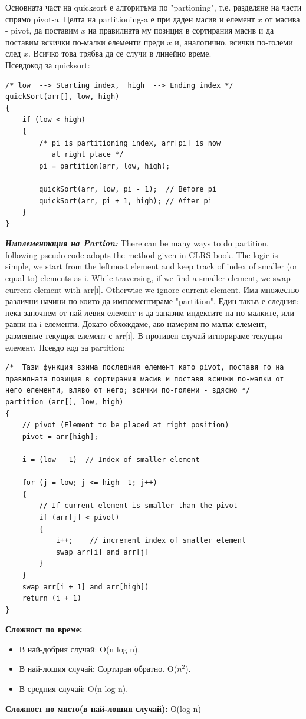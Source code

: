 \documentclass[11pt]{article} %
\newcommand{\italicBold}[1]{\textbf{\emph{#1}}}
\begin{document}
Основната част на quicksort е алгоритъма по "partioning", т.е. разделяне на части спрямо pivot-a. Целта на partitioning-a е при даден масив и елемент $x$ от масива - pivot, да поставим $x$ на правилната му позиция в сортирания масив и да поставим вскички по-малки елементи преди $x$ и, аналогично, всички по-големи след $x$. Всичко това трябва да се случи в линейно време.\\
Псевдокод за quicksort:
\begin{verbatim}
/* low  --> Starting index,  high  --> Ending index */
quickSort(arr[], low, high)
{
    if (low < high)
    {
        /* pi is partitioning index, arr[pi] is now
           at right place */
        pi = partition(arr, low, high);

        quickSort(arr, low, pi - 1);  // Before pi
        quickSort(arr, pi + 1, high); // After pi
    }
}
\end{verbatim}


\italicBold{Имплементация на Partion: }There can be many ways to do partition, following pseudo code adopts the method given in CLRS book. The logic is simple, we start from the leftmost element and keep track of index of smaller (or equal to) elements as i. While traversing, if we find a smaller element, we swap current element with arr[i]. Otherwise we ignore current element. Има множество различни начини по които да имплементираме "partition". Един такъв е следния: нека започнем от най-левия елемент и да запазим индексите на по-малките, или равни на i елементи. Докато обхождаме, ако намерим по-малък елемент, разменяме текущия елемент с arr[i]. В противен случай игнорираме текущия елемент. Псевдо код за partition:
\begin{verbatim}
/*  Тази функция взима последния елемент като pivot, поставя го на правилната позиция в сортирания масив и поставя всички по-малки от него елементи, вляво от него; всички по-големи - вдясно */
partition (arr[], low, high)
{
    // pivot (Element to be placed at right position)
    pivot = arr[high];  
 
    i = (low - 1)  // Index of smaller element

    for (j = low; j <= high- 1; j++)
    {
        // If current element is smaller than the pivot
        if (arr[j] < pivot)
        {
            i++;    // increment index of smaller element
            swap arr[i] and arr[j]
        }
    }
    swap arr[i + 1] and arr[high])
    return (i + 1)
}
\end{verbatim}

\textbf{Сложност по време: }
\begin{itemize}[noitemsep]
	\item В най-добрия случай: O(n log n).
	\item В най-лошия случай: Сортиран обратно. O($n^{2}$).
	\item В средния случай: O(n log n).\\\par
\end{itemize}     
\textbf{Сложност по място(в най-лошия случай): }О(log n)
\end{document}

